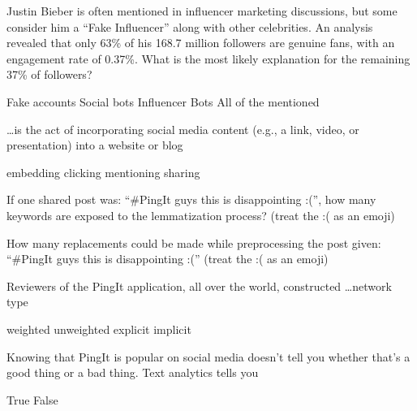 \documentclass[theme=sleek, randomorder, hidesidemenu]{webquiz}
\begin{document}
\begin{question}
  Justin Bieber is often mentioned in influencer marketing discussions, but some consider him a ``Fake Influencer'' along with other celebrities. An analysis revealed that only 63\% of his 168.7 million followers are genuine fans, with an engagement rate of 0.37\%. What is the most likely explanation for the remaining 37\% of followers?

  \begin{choice}[columns=2]
    \incorrect Fake accounts
    \incorrect Social bots
    \incorrect Influencer Bots
    \correct All of the mentioned
  \end{choice}
\end{question}

\begin{question}
  \ldots is the act of incorporating social media content (e.g., a link, video, or presentation) into a website or blog
  \begin{choice}[columns=2]
    \correct embedding
    \incorrect clicking
    \incorrect mentioning
    \incorrect sharing
  \end{choice}
\end{question}

\begin{question}
  If one shared post was: ``\#PingIt guys this is disappointing :('', how many keywords are exposed to the lemmatization process? (treat the :( as an emoji)
\end{question}

\begin{question}
  How many replacements could be made while preprocessing the post given:
  ``\#PingIt guys this is disappointing :('' (treat the :( as an emoji)
\end{question}

\begin{question}
  Reviewers of the PingIt application, all over the world, constructed \ldots network type
  \begin{choice}[columns=2]
    \incorrect weighted
    \incorrect unweighted
    \incorrect explicit
    \correct implicit
  \end{choice}
\end{question}

\begin{question}
Knowing that PingIt is popular on social media doesn’t tell you whether that’s
a good thing or a bad thing. Text analytics tells you
\begin{choice}
  \correct True
  \incorrect False
\end{choice}
\end{question}
\end{document}
